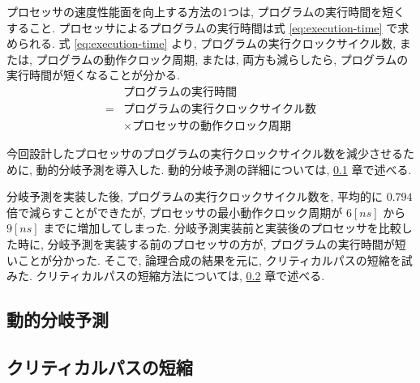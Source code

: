 \documentclass[../main.tex]{subfiles}
\begin{document}
  プロセッサの速度性能面を向上する方法の1つは, プログラムの実行時間を短くすること.
  プロセッサによるプログラムの実行時間は式 \ref{eq:execution-time} で求められる.
  式 \ref{eq:execution-time} より, プログラムの実行クロックサイクル数, 
  または, プログラムの動作クロック周期, 
  または, 両方も減らしたら, プログラムの実行時間が短くなることが分かる.
  \begin{equation}
    \begin{aligned}
      &プログラムの実行時間 \\
      = &プログラムの実行クロックサイクル数 \\
      &\times プロセッサの動作クロック周期
      \label{eq:execution-time}
    \end{aligned}
  \end{equation}

  今回設計したプロセッサのプログラムの実行クロックサイクル数を減少させるために, 動的分岐予測を導入した.
  動的分岐予測の詳細については, \ref{subsection:jump-prediction} 章で述べる.

  分岐予測を実装した後, プログラムの実行クロックサイクル数を, 
  平均的に $0.794$ 倍で減らすことができたが, %
  プロセッサの最小動作クロック周期が $6[ns]$ から $9[ns]$ までに増加してしまった.
  分岐予測実装前と実装後のプロセッサを比較した時に, 
  分岐予測を実装する前のプロセッサの方が, 
  プログラムの実行時間が短いことが分かった.
  そこで, 論理合成の結果を元に, クリティカルパスの短縮を試みた.
  クリティカルパスの短縮方法については, \ref{subsection:critical-path} 章で述べる.

  \subsection{動的分岐予測} \label{subsection:jump-prediction}
  

  \subsection{クリティカルパスの短縮} \label{subsection:critical-path}
  
\end{document}
